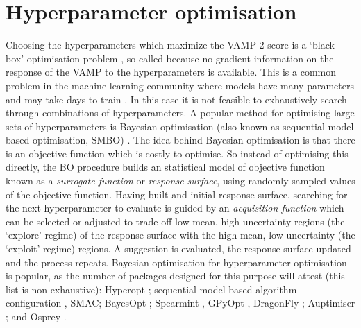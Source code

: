 \section{Hyperparameter optimisation}\label{sec:intro_hyper_opt}
Choosing the hyperparameters which maximize the VAMP-2 score is a `black-box' optimisation problem \cite{jonesEfficientGlobalOptimization1998a}, so called because no gradient information on the response of the VAMP to the hyperparameters is available. This is a common problem in the machine learning community where models have many parameters and may take days to train \cite{feurer2019hyperparameter}. In this case it is not feasible to exhaustively search through combinations of hyperparameters. A popular method for optimising large sets of hyperparameters is Bayesian optimisation (also known as sequential model based optimisation, SMBO)  \cite{hutterSequentialModelbasedOptimization2011} \cite{NIPS2012_4522,bergstraAlgorithmsHyperParameterOptimizationa} \cite{bergstraMakingScienceModel2013}. The idea behind Bayesian optimisation is  \cite{brochuTutorialBayesianOptimization2010,shahriariTakingHumanOut2016} that there is an objective function which is costly to optimise. So instead of optimising this directly, the BO procedure builds an statistical model of  objective function known as a \emph{surrogate function} or \emph{response surface}, using randomly sampled  values of the objective function. Having built and initial response surface, searching for the next hyperparameter to evaluate is guided by an \emph{acquisition function} which can be selected or adjusted to trade off low-mean, high-uncertainty regions (the `explore' regime) of the response surface with the high-mean, low-uncertainty (the `exploit' regime) regions. A suggestion is evaluated, the response surface updated and the process repeats. Bayesian optimisation for hyperparameter optimisation is popular, as the number of packages designed for this purpose will attest (this list is non-exhaustive): Hyperopt \cite{bergstraHyperoptPythonLibrary2013}; sequential model-based algorithm configuration  \cite{hutterSequentialModelbasedOptimization2011}, SMAC; BayesOpt \cite{martinez-cantinBayesOptBayesianOptimization2014}; Spearmint \cite{DBLP:conf/uai/GelbartSA14,snoekAbstractBayesianOptimization2013,snoekInputWarpingBayesian2014a,NIPS2013_5086,NIPS2012_4522}, GPyOpt \cite{gpyopt2016}, DragonFly \cite{JMLR:v21:18-223}; Auptimiser \cite{liuAuptimizerExtensibleOpenSource2019}; and Osprey \cite{mcgibbonOspreyHyperparameterOptimization2016a}.  




